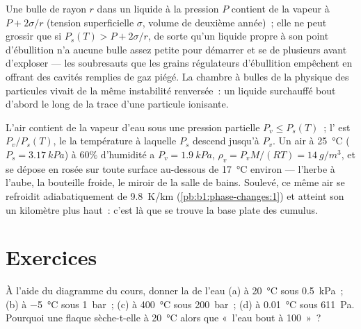 \begin{remark}\label{rem:b1:phase-changes:nucleation}
Une bulle de rayon $r$ dans un liquide à la pression $P$ contient de la vapeur
à $P + 2\sigma/r$ (tension superficielle $\sigma$, volume de deuxième année)~;
elle ne peut grossir que si $P_s(T) > P + 2\sigma/r$, de sorte qu'un liquide
propre à son point d'ébullition n'a aucune bulle assez petite pour démarrer et
se  de plusieurs  avant d'exploser --- les soubresauts que
les grains régulateurs d'ébullition empêchent en offrant des cavités remplies
de gaz piégé. La chambre à bulles de la physique des particules vivait de la
même instabilité renversée~: un liquide surchauffé bout d'abord le long de la
trace d'une particule ionisante.
\end{remark}

\begin{example}\label{ex:b1:phase-changes:dew}
L'air contient de la vapeur d'eau sous une pression partielle $P_v \leq P_s(T)$~;
l'\emph{} est $P_v/P_s(T)$, le \emph{} la
température à laquelle $P_s$ descend jusqu'à $P_v$. Un air à
\qty{25}{\degreeCelsius} ($P_s = \qty{3.17}{kPa}$) à $60\%$ d'humidité a
$P_v = \qty{1.9}{kPa}$, $\rho_v = P_vM/(RT) = \qty{14}{g/m^3}$, et se dépose
en rosée sur toute surface au-dessous de \qty{17}{\degreeCelsius} environ ---
l'herbe à l'aube, la bouteille froide, le miroir de la salle de bains. Soulevé,
ce même air se refroidit adiabatiquement de \qty{9.8}{K/km}
(\cref{pb:b1:phase-changes:1}) et atteint son  un kilomètre plus
haut~: c'est là que se trouve la base plate des cumulus.
\end{example}

\section{Exercices}

\begin{exercise}[$\star$]\label{exo:b1:phase-changes:1}
À l'aide du diagramme du cours, donner la  de l'eau (a) à
\qty{20}{\degreeCelsius} sous \qty{0.5}{kPa}~; (b) à \qty{-5}{\degreeCelsius}
sous \qty{1}{bar}~; (c) à \qty{400}{\degreeCelsius} sous \qty{200}{bar}~;
(d) à \qty{0.01}{\degreeCelsius} sous \qty{611}{Pa}. Pourquoi une flaque
sèche-t-elle à \qty{20}{\degreeCelsius} alors que «~l'eau bout à 100~»~?
\end{exercise}

